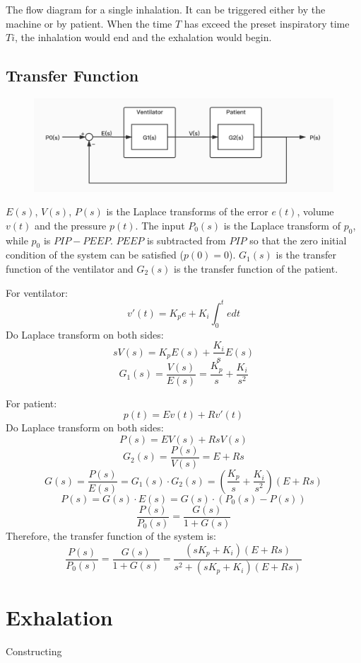 \documentclass{article}
\begin{document}
The flow diagram for a single inhalation. It can be triggered either by the machine or by patient. When the time $T$ has exceed the preset inspiratory time $Ti$, the inhalation would end and the exhalation would begin.

\newpage

\subsection{Transfer Function}
\begin{figure}[h]
\centering
\includegraphics[scale=0.3]{block-diagram.jpg}
\end{figure}

$E(s)$, $V(s)$, $P(s)$ is the Laplace transforms of the error $e(t)$, volume $v(t)$ and the pressure $p(t)$. The input $P_{0}(s)$ is the Laplace transform of $p_{0}$, while $p_{0}$ is $PIP-PEEP$. $PEEP$ is subtracted from $PIP$ so that the zero initial condition of the system can be satisfied ($p(0)=0$). $G_1(s)$ is the transfer function of the ventilator and $G_2(s)$ is the transfer function of the patient.

For ventilator:
$$v'(t)=K_pe+K_i\int _0^tedt$$
Do Laplace transform on both sides:
$$sV(s)=K_pE(s)+\frac{K_i}{s}E(s)$$
$$G_1(s)=\frac{V(s)}{E(s)}=\frac{K_p}{s}+\frac{K_i}{s^2}$$

For patient:
$$p(t)=Ev(t)+Rv'(t)$$
Do Laplace transform on both sides:
$$P(s)=EV(s)+RsV(s)$$
$$G_2(s)=\frac{P(s)}{V(s)}=E+Rs$$
$$G(s)=\frac{P(s)}{E(s)}=G_1(s)\cdot G_2(s)=(\frac{K_p}{s}+\frac{K_i}{s^2})(E+Rs)$$
$$P(s)=G(s)\cdot E(s)=G(s)\cdot (P_0(s)-P(s))$$
$$\frac{P(s)}{P_0(s)}=\frac{G(s)}{1+G(s)}$$
Therefore, the transfer function of the system is:
$$\frac{P(s)}{P_0(s)}=\frac{G(s)}{1+G(s)}=\frac{(sK_p+K_i)(E+Rs)}{s^2+(sK_p+K_i)(E+Rs)}$$

\section{Exhalation}
Constructing
\end{document}
